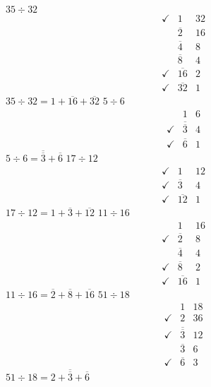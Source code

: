 \documentclass[12pt]{article}
\begin{document}
\begin{enumerate}[label=\arabic*.]
\begin{tasks}[label=\alph*.]
        \task$35 \div 32$
        \begin{align*}
            \checkmark&1 & 32 \\
            &\overline{2} & 16\\
            &\overline{4} & 8 \\
            &\overline{8} & 4 \\
            \checkmark&\overline{16} & 2 \\
            \checkmark&\overline{32} & 1
        \end{align*}
        $35 \div 32 = 1 + \overline{16} + \overline{32}$
        \task$5 \div 6$
        \begin{align*}
            &1 & 6 \\
            \checkmark&\overline{\overline{3}} & 4\\
            \checkmark&\overline{6} & 1 
        \end{align*}
        $5 \div 6 = \overline{\overline{3}} + \overline{6}$ 
        \task$17 \div 12$
        \begin{align*}
            \checkmark&1 & 12\\
            \checkmark&\overline{3} & 4\\
            \checkmark&\overline{12} &1
        \end{align*}
        $17 \div 12 = 1 + \overline{3} + \overline{12}$
        \task$11 \div 16$
        \begin{align*}
            &1 & 16 \\
            \checkmark&\overline{2} & 8 \\
            &\overline{4} & 4 \\
            \checkmark&\overline{8} & 2 \\
            \checkmark&\overline{16} & 1
        \end{align*}
        $11 \div 16 = \overline{2} + \overline{8} + \overline{16}$
        \task$51 \div 18$
        \begin{align*}
            &1 & 18 \\
            \checkmark&2 & 36 \\
            \checkmark&\overline{\overline{3}} & 12 \\
            &\overline{3} & 6 \\
            \checkmark&\overline{6} & 3
        \end{align*}
        $51 \div 18 = 2 + \overline{\overline{3}} + \overline{6}$
    \end{tasks}

\end{enumerate}
\end{document}
